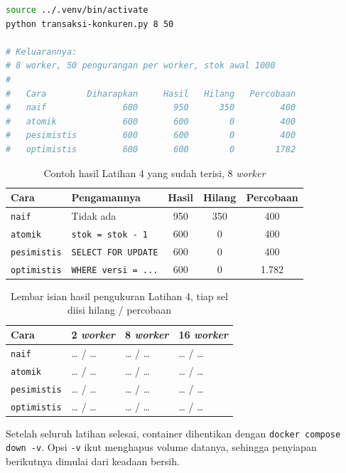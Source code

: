 \begin{lstlisting}[language=bash, caption={Memperagakan lost update dan tiga pengamannya, tersedia di \berkas{sources/chapter03/transaksi-konkuren.py}}, label={lst:c3-lat4-jalan}]
source ../.venv/bin/activate
python transaksi-konkuren.py 8 50

# Keluarannya:
# 8 worker, 50 pengurangan per worker, stok awal 1000
#
#   Cara        Diharapkan     Hasil   Hilang   Percobaan
#   naif               600       950      350         400
#   atomik             600       600        0         400
#   pesimistis         600       600        0         400
#   optimistis         600       600        0        1782
\end{lstlisting}

\begin{table}[!htb]
  \centering
  \caption{Contoh hasil Latihan 4 yang sudah terisi, 8 \textit{worker}}
  \label{tab:c3-lat4-contoh}
  \begin{tabularx}{\textwidth}{lXccc}
    \hline
    \textbf{Cara} & \textbf{Pengamannya} & \textbf{Hasil} & \textbf{Hilang} & \textbf{Percobaan} \\
    \hline
    \texttt{naif} & Tidak ada & 950 & 350 & 400 \\
    \hline
    \texttt{atomik} & \texttt{stok = stok - 1} & 600 & 0 & 400 \\
    \hline
    \texttt{pesimistis} & \texttt{SELECT FOR UPDATE} & 600 & 0 & 400 \\
    \hline
    \texttt{optimistis} & \texttt{WHERE versi = ...} & 600 & 0 & 1.782 \\
    \hline
  \end{tabularx}
\end{table}

\begin{table}[!htb]
  \centering
  \caption{Lembar isian hasil pengukuran Latihan 4, tiap sel diisi hilang / percobaan}
  \label{tab:c3-lat4-hasil}
  \begin{tabularx}{\textwidth}{lXXX}
    \hline
    \textbf{Cara} & \textbf{2 \textit{worker}} & \textbf{8 \textit{worker}} & \textbf{16 \textit{worker}} \\
    \hline
    \texttt{naif} & \dots{} / \dots & \dots{} / \dots & \dots{} / \dots \\
    \hline
    \texttt{atomik} & \dots{} / \dots & \dots{} / \dots & \dots{} / \dots \\
    \hline
    \texttt{pesimistis} & \dots{} / \dots & \dots{} / \dots & \dots{} / \dots \\
    \hline
    \texttt{optimistis} & \dots{} / \dots & \dots{} / \dots & \dots{} / \dots \\
    \hline
  \end{tabularx}
\end{table}

Setelah seluruh latihan selesai, container dihentikan dengan
\texttt{docker compose down -v}. Opsi \texttt{-v} ikut menghapus volume
datanya, sehingga penyiapan berikutnya dimulai dari keadaan bersih.
